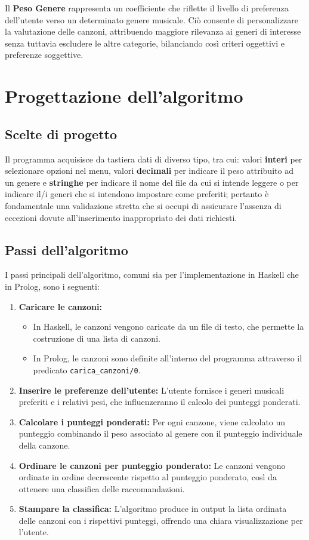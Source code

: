 \documentclass[a4paper,11pt]{article}
\begin{document}
\noindent
Il \textbf{Peso Genere} rappresenta un coefficiente che riflette il livello di preferenza dell’utente verso un determinato genere musicale. Ciò consente di personalizzare la valutazione delle canzoni, attribuendo maggiore rilevanza ai generi di interesse senza tuttavia escludere le altre categorie, bilanciando così criteri oggettivi e preferenze soggettive.  

\newpage
\section{Progettazione dell'algoritmo}
\subsection{Scelte di progetto}
Il programma acquisisce da tastiera dati di diverso tipo, tra cui: valori \textbf{interi} per selezionare opzioni nel menu, valori \textbf{decimali} per indicare il peso attribuito ad un genere e \textbf{stringhe} per indicare il nome del file da cui si intende leggere o per indicare il/i generi che si intendono impostare come preferiti; pertanto è fondamentale una validazione stretta che si occupi di assicurare l’assenza di eccezioni dovute all’inserimento inappropriato dei dati richiesti.


\newpage
\subsection{Passi dell'algoritmo}
I passi principali dell'algoritmo, comuni sia per l'implementazione in Haskell che in Prolog, sono i seguenti:

\begin{enumerate}
    \item \textbf{Caricare le canzoni:} 
    \begin{itemize}
        \item In Haskell, le canzoni vengono caricate da un file di testo, che permette la costruzione di una lista di canzoni.
        \item In Prolog, le canzoni sono definite all’interno del programma attraverso il predicato \texttt{carica\_canzoni/0}.
    \end{itemize}
    \item \textbf{Inserire le preferenze dell'utente:} 
    L’utente fornisce i generi musicali preferiti e i relativi pesi, che influenzeranno il calcolo dei punteggi ponderati.
    \item \textbf{Calcolare i punteggi ponderati:} 
    Per ogni canzone, viene calcolato un punteggio combinando il peso associato al genere con il punteggio individuale della canzone.
    \item \textbf{Ordinare le canzoni per punteggio ponderato:} 
    Le canzoni vengono ordinate in ordine decrescente rispetto al punteggio ponderato, così da ottenere una classifica delle raccomandazioni.
    \item \textbf{Stampare la classifica:} 
    L’algoritmo produce in output la lista ordinata delle canzoni con i rispettivi punteggi, offrendo una chiara visualizzazione per l’utente.
\end{enumerate}
\end{document}
